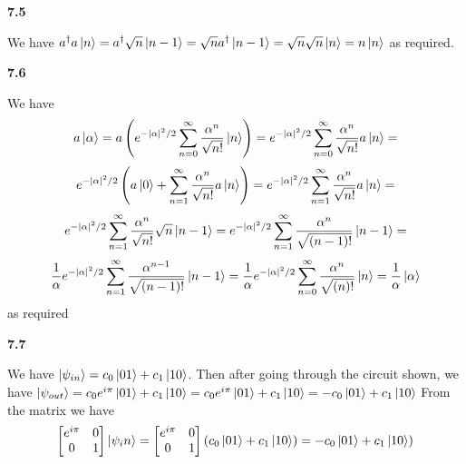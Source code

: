 \textbf{7.5}

We have $ a^\dag a\ket{n} = a^\dag \sqrt{n}\ket{n-1} =\sqrt{n}a^\dag \ket{n-1} = \sqrt{n}\sqrt{n}\ket{n} = n\ket{n}$ as required.

\textbf{7.6}

We have \[a\ket{\alpha} = a\left(e^{-|\alpha|^2/2}\sum_{n=0}^\infty\frac{\alpha^n}{\sqrt{n!}}\ket{n}\right)=e^{-|\alpha|^2/2}\sum_{n=0}^\infty\frac{\alpha^n}{\sqrt{n!}}a\ket{n} =\]\[e^{-|\alpha|^2/2}\left(a\ket{0}+\sum_{n=1}^\infty\frac{\alpha^n}{\sqrt{n!}}a\ket{n}\right) = e^{-|\alpha|^2/2}\sum_{n=1}^\infty\frac{\alpha^n}{\sqrt{n!}}a\ket{n} = \]\[e^{-|\alpha|^2/2}\sum_{n=1}^\infty\frac{\alpha^n}{\sqrt{n!}}\sqrt{n}\ket{n-1} = e^{-|\alpha|^2/2}\sum_{n=1}^\infty\frac{\alpha^n}{\sqrt{(n-1)!}}\ket{n-1} =\] \[\frac{1}{\alpha}e^{-|\alpha|^2/2}\sum_{n=1}^\infty\frac{\alpha^{n-1}}{\sqrt{(n-1)!}}\ket{n-1} = \frac{1}{\alpha}e^{-|\alpha|^2/2}\sum_{n=0}^\infty\frac{\alpha^{n}}{\sqrt{(n)!}}\ket{n} = \frac{1}{\alpha}\ket{\alpha}\]
as required

\textbf{7.7}

We have $\ket{\psi_{in}} = c_0\ket{01} +c_1\ket{10}$. Then after going through the circuit shown, we have $\ket{\psi_{out}} = c_0e^{i\pi}\ket{01} +c_1\ket{10} =c_0e^{i\pi}\ket{01} +c_1\ket{10} =  -c_0\ket{01} +c_1\ket{10} $
From the matrix we have
\[\begin{bmatrix}
    e^{i\pi} & 0 \\
    0 & 1
\end{bmatrix}\ket{\psi_in} =\begin{bmatrix}
    e^{i\pi} & 0 \\
    0 & 1
\end{bmatrix}(c_0\ket{01} +c_1\ket{10}) = -c_0\ket{01} +c_1\ket{10}) \]